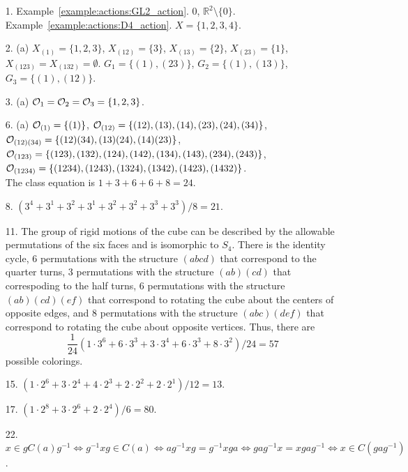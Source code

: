 {\small
\begin{itemize}
 
\item[1.] 
Example~\ref{example:actions:GL2_action}. $0$, ${\mathbb R}^2 \setminus \{ 0 \}$. \\
Example~\ref{example:actions:D4_action}. $X = \{ 1, 2, 3, 4 \}$.

 
\item[2.]
(a) $X_{(1)} = \{1, 2, 3  \}$, $X_{(12)} = \{3 \}$, $X_{(13)}=
\{ 2 \}$, $X_{(23)} = \{1 \}$, $X_{(123)} = X_{(132)} = \emptyset$.
$G_1 = \{ (1), (23) \}$, $G_2 = \{(1), (13) \}$, $G_3 = \{ (1),
(12)\}$.
 
\item[3.]
(a) 
${\cal O}_1 = {\cal O}_2 = {\cal O}_3 = \{ 1, 2, 3\}$.
 
 
\item[6.]
(a)
${\cal O}_{(1)} = \{ (1) \}$, 
${\cal O}_{(12)} = \{ (12), (13), (14), (23), (24), (34) \}$, \\
${\cal O}_{(12)(34)} = \{ (12)(34), (13)(24), (14)(23) \}$, \\
${\cal O}_{(123)} = \{ (123), (132), (124), (142), (134), (143),
(234), (243) \}$,  \\
${\cal O}_{(1234)} = \{ (1234), (1243), (1324), (1342), (1423), (1432)
\}$. \\
The class equation is $1 + 3 + 6 + 6 + 8 = 24$.
 
\item[8.]
$(3^4 + 3^1 + 3^2 + 3^1 + 3^2 + 3^2 + 3^3 + 3^3)/8 = 21$.
 
\item[11.]
The group of rigid motions of the cube can be described by the allowable permutations of the six faces and is isomorphic to $S_4$.  There is the identity cycle, 6 permutations with the structure $(abcd)$ that correspond to the quarter turns, 3 permutations with the structure $(ab)(cd)$ that correspoding to the half turns,  6 permutations with the structure $(ab)(cd)(ef)$ that correspond to rotating the cube about the centers of opposite edges, and 8 permutations with the structure $(abc)(def)$ that correspond to rotating the cube about opposite vertices.  Thus, there are
\[
\frac{1}{24}(1 \cdot 3^6 + 6 \cdot 3^3 + 3 \cdot 3^4 + 6  \cdot  3^3 + 8 \cdot 3^2)/24 = 57
\]
possible colorings.
 
\item[15.]
$(1 \cdot 2^6 + 3 \cdot 2^4 + 4 \cdot 2^3 + 2 \cdot 2^2 
+ 2 \cdot 2^1)/12 = 13$.
 
\item[17.]
$(1 \cdot 2^8 + 3 \cdot 2^6 + 2 \cdot 2^4)/6 = 80$.
 
 
\item[22.]
$x \in g C(a) g^{-1} \Longleftrightarrow g^{-1}x g \in C(a) \Longleftrightarrow
a g^{-1} x g = g^{-1} x g a \Longleftrightarrow g a g^{-1} x = x g a
g^{-1} \Longleftrightarrow x \in C(gag^{-1})$. 
 
\end{itemize}
}
 
